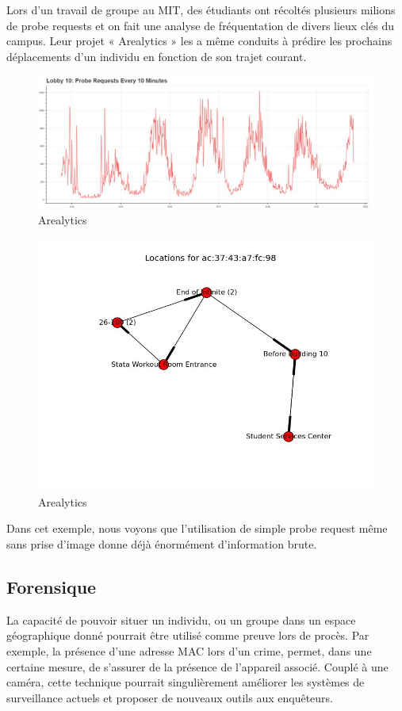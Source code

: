 Lors d’un travail de groupe au MIT, des étudiants ont récoltés plusieurs milions de probe requests et on fait une
analyse de fréquentation de divers lieux clés du campus. Leur projet « Arealytics » les a même conduits à prédire
les prochains déplacements d’un individu en fonction de son trajet courant.
\begin{figure}[H]
	\centering
	\includegraphics[width=16cm]{images/etude-legi-1.jpg}
	\caption{Arealytics}
	\label{fig:arealytics}
\end{figure}
\begin{figure}[H]
	\centering
	\includegraphics[width=12cm]{images/etude-legi-2.jpg}
	\caption{Arealytics}
	\label{fig:prediction de chemins à l'aide de probe}
\end{figure}

Dans cet exemple, nous voyons que l’utilisation de simple probe request même sans prise d’image donne déjà
énormément d’information brute.

\subsection{Forensique}
La capacité de pouvoir situer un individu, ou un groupe dans un espace géographique donné pourrait être utilisé
comme preuve lors de procès. Par exemple, la présence d’une adresse MAC lors d’un crime, permet, dans une certaine mesure, 
de s’assurer de la présence de l’appareil associé. Couplé à une caméra, cette technique pourrait
singulièrement améliorer les systèmes de surveillance actuels et proposer de nouveaux outils aux enquêteurs.

